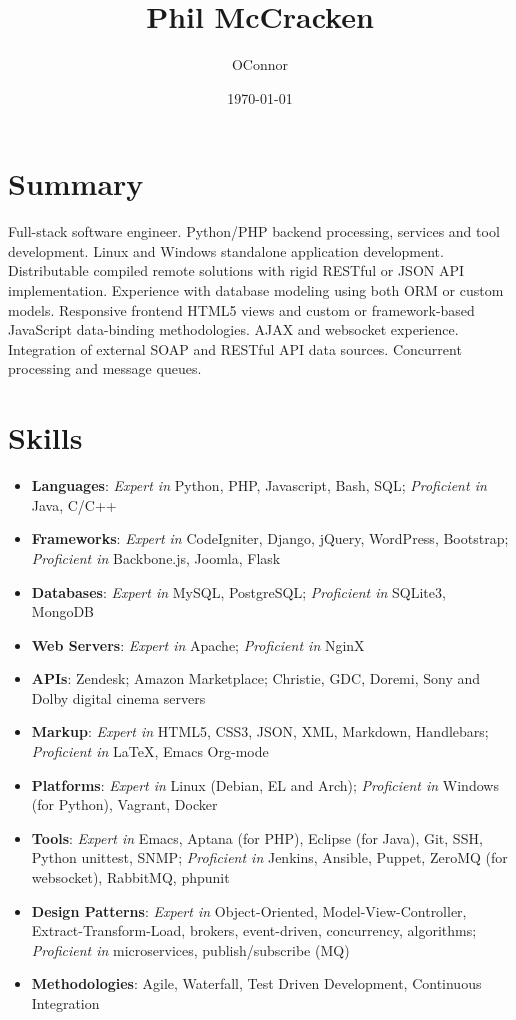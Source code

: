 \documentclass[letterpaper]{article}
\author{OConnor}
\date{\today}
\title{Phil McCracken}
\begin{document}
\maketitle


\section{Summary}
\label{sec-1}

Full-stack software engineer. Python/PHP backend processing, services and tool development. Linux and Windows standalone application development. Distributable compiled remote solutions with rigid RESTful or JSON API implementation. Experience with database modeling using both ORM or custom models. Responsive frontend HTML5 views and custom or framework-based JavaScript data-binding methodologies. AJAX and websocket experience. Integration of external SOAP and RESTful API data sources. Concurrent processing and message queues.

\section{Skills}
\label{sec-2}

\begin{itemize}
\item \textbf{Languages}: \emph{Expert in} Python, PHP, Javascript, Bash, SQL; \emph{Proficient in} Java, C/C++
\item \textbf{Frameworks}: \emph{Expert in} CodeIgniter, Django, jQuery, WordPress, Bootstrap; \emph{Proficient in} Backbone.js, Joomla, Flask
\item \textbf{Databases}: \emph{Expert in} MySQL, PostgreSQL; \emph{Proficient in} SQLite3, MongoDB
\item \textbf{Web Servers}: \emph{Expert in} Apache; \emph{Proficient in} NginX
\item \textbf{APIs}: Zendesk; Amazon Marketplace; Christie, GDC, Doremi, Sony and Dolby digital cinema servers
\item \textbf{Markup}: \emph{Expert in} HTML5, CSS3, JSON, XML, Markdown, Handlebars; \emph{Proficient in} \LaTeX{}, Emacs Org-mode
\item \textbf{Platforms}: \emph{Expert in} Linux (Debian, EL and Arch); \emph{Proficient in} Windows (for Python), Vagrant, Docker
\item \textbf{Tools}: \emph{Expert in} Emacs, Aptana (for PHP), Eclipse (for Java), Git, SSH, Python unittest, SNMP; \emph{Proficient in} Jenkins, Ansible, Puppet, ZeroMQ (for websocket), RabbitMQ, phpunit
\item \textbf{Design Patterns}: \emph{Expert in} Object-Oriented, Model-View-Controller, Extract-Transform-Load, brokers, event-driven, concurrency, algorithms; \emph{Proficient in} microservices, publish/subscribe (MQ)
\item \textbf{Methodologies}: Agile, Waterfall, Test Driven Development, Continuous Integration
\end{itemize}
\end{document}
